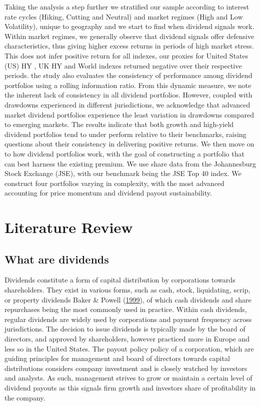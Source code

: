 \documentclass[12pt,preprint, authoryear]{elsarticle}
\numberwithin{equation}{section}
\numberwithin{figure}{section}
\numberwithin{table}{section}
\begin{document}
Taking the analysis a step further we stratified our sample according to
interest rate cycles (Hiking, Cutting and Neutral) and market regimes
(High and Low Volatility), unique to geography and we start to find when
dividend signals work. Within market regimes, we generally observe that
dividend signals offer defensive characteristics, thus giving higher
excess returns in periods of high market stress. This does not infer
positive return for all indexes, our proxies for United States (US) HY ,
UK HY and World indexes returned negative over their respective periods.
the study also evaluates the consistency of performance among dividend
portfolios using a rolling information ratio. From this dynamic measure,
we note the inherent lack of consistency in all dividend portfolios.
However, coupled with drawdowns experienced in different jurisdictions,
we acknowledge that advanced market dividend portfolios experience the
least variation in drawdowns compared to emerging markets. The results
indicate that both growth and high-yield dividend portfolios tend to
under perform relative to their benchmarks, raising questions about
their consistency in delivering positive returns. We then move on to how
dividend portfolios work, with the goal of constructing a portfolio that
can best harness the existing premium. We use share data from the
Johannesburg Stock Exchange (JSE), with our benchmark being the JSE Top
40 index. We construct four portfolios varying in complexity, with the
most advanced accounting for price momentum and dividend payout
sustainability.

\newpage

\hypertarget{literature-review}{%
\section{Literature Review}\label{literature-review}}

\hypertarget{what-are-dividends}{%
\subsection{What are dividends}\label{what-are-dividends}}

Dividends constitute a form of capital distribution by corporations
towards shareholders. They exist in various forms, such as cash, stock,
liquidating, scrip, or property dividends Baker \& Powell
(\protect\hyperlink{ref-baker1999corporate}{1999}), of which cash
dividends and share repurchases being the most commonly used in
practice. Within cash dividends, regular dividends are widely used by
corporations and payment frequency across jurisdictions. The decision to
issue dividends is typically made by the board of directors, and
approved by shareholders, however practiced more in Europe and less so
in the United States. The payout policy policy of a corporation, which
are guiding principles for management and board of directors towards
capital distributions considers company investment and is closely
watched by investors and analysts. As such, management strives to grow
or maintain a certain level of dividend payouts as this signals firm
growth and investors share of profitability in the company.
\end{document}
